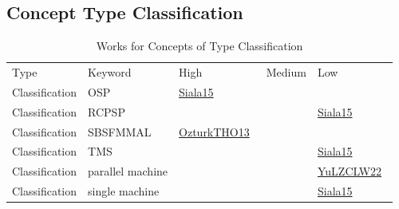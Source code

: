 \clearpage
\subsection{Concept Type Classification}
\label{sec:Classification}
{\scriptsize
\begin{longtable}{lp{3cm}>{\raggedright\arraybackslash}p{6cm}>{\raggedright\arraybackslash}p{6cm}>{\raggedright\arraybackslash}p{8cm}}
\rowcolor{white}\caption{Works for Concepts of Type Classification}\\ \toprule
\rowcolor{white}Type & Keyword & High & Medium & Low\\ \midrule\endhead
\bottomrule
\endfoot
Classification & OSP & \href{../cars/works/Siala15.pdf}{Siala15}~\cite{Siala15} &  & \\
Classification & RCPSP &  &  & \href{../cars/works/Siala15.pdf}{Siala15}~\cite{Siala15}\\
Classification & SBSFMMAL & \href{../cars/works/OzturkTHO13.pdf}{OzturkTHO13}~\cite{OzturkTHO13} &  & \\
Classification & TMS &  &  & \href{../cars/works/Siala15.pdf}{Siala15}~\cite{Siala15}\\
Classification & parallel machine &  &  & \href{../cars/works/YuLZCLW22.pdf}{YuLZCLW22}~\cite{YuLZCLW22}\\
Classification & single machine &  &  & \href{../cars/works/Siala15.pdf}{Siala15}~\cite{Siala15}\\
\end{longtable}
}

